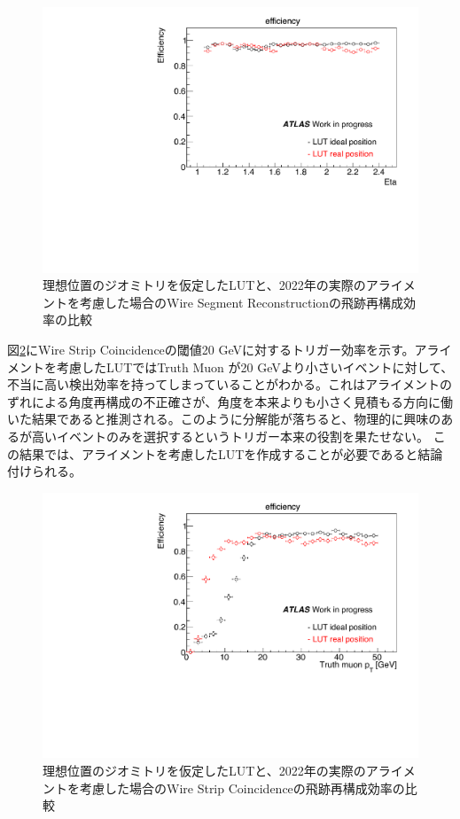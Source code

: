\begin{figure} 
\centering
\includegraphics[width=16cm]{fig/Test/alignment_wire.pdf}
\caption[]{理想位置のジオミトリを仮定したLUTと、2022年の実際のアライメントを考慮した場合のWire Segment Reconstructionの飛跡再構成効率の比較}
\label{alignment_wire}
\end{figure}

図\ref{alignment_ws}にWire Strip Coincidenceの\pt 閾値20 GeVに対するトリガー効率を示す。アライメントを考慮したLUTではTruth Muon \pt が20 GeVより小さいイベントに対して、不当に高い検出効率を持ってしまっていることがわかる。これはアライメントのずれによる角度再構成の不正確さが、角度を本来よりも小さく見積もる方向に働いた結果であると推測される。このように\pt 分解能が落ちると、物理的に興味のある\pt が高いイベントのみを選択するというトリガー本来の役割を果たせない。
この結果では、アライメントを考慮したLUTを作成することが必要であると結論付けられる。

\begin{figure} 
\centering
\includegraphics[width=16cm]{fig/Test/alignment_ws.pdf}
\caption[CTAの完成想像図]{理想位置のジオミトリを仮定したLUTと、2022年の実際のアライメントを考慮した場合のWire Strip Coincidenceの飛跡再構成効率の比較}
\label{alignment_ws}
\end{figure}


